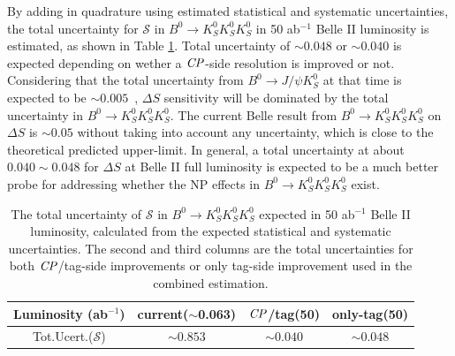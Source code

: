 By adding in quadrature using estimated statistical and systematic uncertainties, the total uncertainty for $\mathcal{S}$ in $B^0 \to K_S^0  K_S^0  K_S^0$ in 50 ab$^{-1}$ Belle II luminosity is estimated, as shown in Table \ref{tab:err_full}. Total uncertainty of $\sim 0.048$ or $\sim 0.040$ is expected depending on wether a $\it{CP}$-side resolution is improved or not. Considering that the total uncertainty from $B^0\to J/\psi K_S^0$ at that time is expected to be $\sim 0.005$~\cite{b2book}, $\Delta S$ sensitivity  will be dominated by the total uncertainty in $B^0 \to K_S^0  K_S^0  K_S^0$. The current Belle result from $B^0 \to K_S^0  K_S^0  K_S^0$ on $\Delta S$ is $\sim0.05$ without taking into account any uncertainty, which is close to the theoretical predicted upper-limit. In general, a total uncertainty at about $0.040\sim 0.048$ for $\Delta S$ at Belle II full luminosity is expected to be a much better probe for addressing whether the NP effects in $B^0 \to K_S^0  K_S^0  K_S^0$ exist.

\begin{table}[htpb]
	\centering
	\caption{The total uncertainty of $\mathcal{S}$ in $B^0 \to K_S^0  K_S^0  K_S^0$ expected in 50 ab$^{-1}$ Belle II luminosity, calculated from the expected statistical and systematic uncertainties. The second and third columns are the total uncertainties for both $\it{CP}$/tag-side improvements or only tag-side improvement used in the combined estimation.}
	\label{tab:err_full}
	\begin{tabular}{c|c|c |c}
		\hline
		Luminosity (ab$^{-1}$) & current($\sim$0.063)&$\it{CP}$/tag(50) & only-tag(50)\\
		\hline
		Tot.Ucert.($\mathcal{S}$) & $\sim0.853$ & $\sim0.040$ & $\sim0.048$ \\
		\hline
	\end{tabular}
\end{table}

